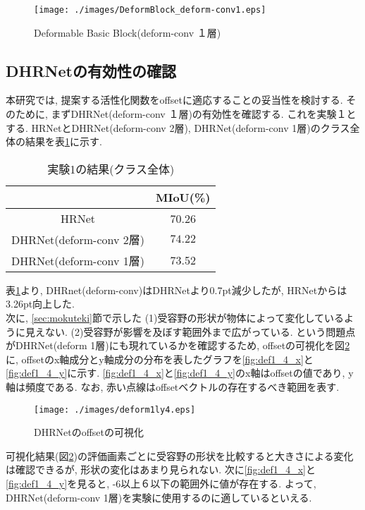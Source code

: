 \begin{figure}[H]
    \centering
    \texttt{[image: ./images/DeformBlock\_deform-conv1.eps]}
    \caption{Deformable Basic Block(deform-conv １層)}
    \label{fig:defbasicblockv2}
\end{figure}

\subsection{DHRNetの有効性の確認}
本研究では, 提案する活性化関数をoffsetに適応することの妥当性を検討する. 
そのために, まずDHRNet(deform-conv １層)の有効性を確認する. これを実験１とする. HRNetとDHRNet(deform-conv 2層), DHRNet(deform-conv 1層)のクラス全体の結果を表\ref{tab:tekiyouiti}に示す.

\begin{table}[H]
    \centering
    \caption{実験1の結果(クラス全体)}
    \begin{tabular}{c|c} \hline \hline
       & MIoU(\%)  \\ \hline
      HRNet & 70.26  \\ \hline
      DHRNet(deform-conv 2層) & $\mathbf{74.22}$  \\ \hline
      DHRNet(deform-conv 1層) & 73.52  \\ \hline \hline 
    \end{tabular}
    \label{tab:tekiyouiti}
\end{table}
表\ref{tab:tekiyouiti}より, DHRnet(deform-conv)はDHRNetより0.7pt減少したが, HRNetからは3.26pt向上した. \\
次に, \ref{sec:mokuteki}節で示した (1)受容野の形状が物体によって変化しているように見えない. (2)受容野が影響を及ぼす範囲外まで広がっている.  という問題点がDHRNet(deform 1層)にも現れているかを確認するため, offsetの可視化を図\ref{fig:def1_4}に, offsetのx軸成分とy軸成分の分布を表したグラフを\ref{fig:def1_4_x}と\ref{fig:def1_4_y}に示す. \ref{fig:def1_4_x}と\ref{fig:def1_4_y}のx軸はoffsetの値であり, y軸は頻度である. なお, 赤い点線はoffsetベクトルの存在するべき範囲を表す.

\begin{figure}[H]
    \begin{center}
    \texttt{[image: ./images/deform1ly4.eps]}
    \end{center}
    \caption{DHRNetのoffsetの可視化}
    \label{fig:def1_4}
\end{figure}

可視化結果(図\ref{fig:def1_4})の評価画素ごとに受容野の形状を比較すると大きさによる変化は確認できるが, 形状の変化はあまり見られない. 次に\ref{fig:def1_4_x}と\ref{fig:def1_4_y}を見ると, -6以上６以下の範囲外に値が存在する. よって, DHRNet(deform-conv 1層)を実験に使用するのに適しているといえる.

